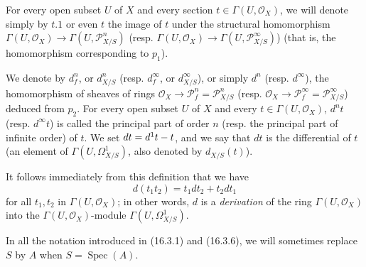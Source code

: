 For every open subset $U$ of $X$ and every section $t\in\Gamma(U,\mathcal{O}_X)$, we
will denote simply by $t.1$ or even $t$ the image of $t$ under the structural
homomorphism $\Gamma(U,\mathcal{O}_X)\to\Gamma(U,\mathscr{P}_{X/S}^n)$ (resp.
$\Gamma(U,\mathcal{O}_X)\to\Gamma(U,\mathscr{P}_{X/S}^\infty)$)
(that is, the homomorphism corresponding to $p_1$).

\begin{definition}[16.3.6]\label{IV.16.3.6}
We denote by $d_f^n$, or $d_{X/S}^n$ \textup{(resp.} $d_f^\infty$, or
$d_{X/S}^\infty$), or simply $d^n$ \textup{(resp.} $d^\infty$), the homomorphism of
sheaves of rings $\mathcal{O}_X\to\mathscr{P}_f^n=\mathscr{P}_{X/S}^n$
\textup{(resp.} $\mathcal{O}_X\to\mathscr{P}_f^\infty=\mathscr{P}_{X/S}^\infty$)
deduced from $p_2$. For every open subset $U$ of $X$ and every
$t\in\Gamma(U,\mathcal{O}_X)$, $d^nt$ \textup{(resp.} $d^\infty t$) is called \textup{the principal
part of order $n$ (resp. the principal part of infinite order)} of $t$. We set
$dt=d^1t- t$, and we say that $dt$ is the differential of $t$ (an element of
$\Gamma(U,\varOmega_{X/S}^1)$, also denoted by $d_{X/S}(t)$).
\end{definition}

It follows immediately from this definition that we have
\[
  d(t_1t_2)=t_1dt_2+t_2dt_1
  \tag{16.3.6.1}
  \label{IV.16.3.6.1}
\]
for all $t_1,t_2$ in $\Gamma(U,\mathcal{O}_X)$; in other words, $d$
is a \emph{derivation} of the ring $\Gamma(U,\mathcal{O}_X)$ into the
$\Gamma(U,\mathcal{O}_X)$-module $\Gamma(U,\varOmega_{X/S}^1)$.

In all the notation introduced in (16.3.1) and (16.3.6), we will
sometimes replace $S$ by $A$ when $S=\operatorname{Spec}(A)$.

